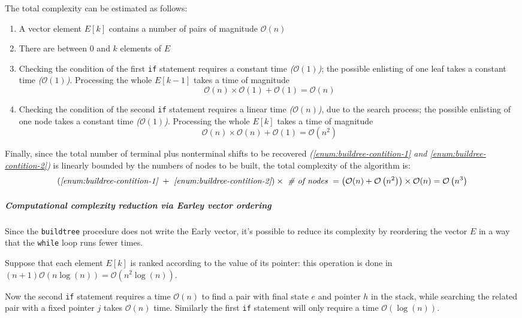 \documentclass[english]{article}
\begin{document}
The total complexity can be estimated as follows:

\begin{enumerate}[label=\arabic*, ref=(\arabic*)]
  \item A vector element \(E[k]\) contains a number of pairs of magnitude \(\mathcal{O}(n)\)
  \item There are between \(0\) and \(k\) elements of \(E\)
        \item\label{enum:buildree-contition-1} Checking the condition of the first \texttt{if} statement requires a constant time \textit{(\(\mathcal{O}(1)\))}; the possible enlisting of one leaf takes a constant time \textit{(\(\mathcal{O}(1)\))}. Processing the whole \(E[k-1]\) takes a time of magnitude
        \[ \mathcal{O}(n) \times \mathcal{O}(1) + \mathcal{O}(1) = \mathcal{O}(n) \]
        \item\label{enum:buildree-contition-2} Checking the condition of the second \texttt{if} statement requires a linear time \textit{(\(\mathcal{O}(n)\))}, due to the search process; the possible enlisting of one node takes a constant time \textit{(\(\mathcal{O}(1)\))}. Processing the whole \(E[k]\) takes a time of magnitude
        \[ \mathcal{O}(n) \times \mathcal{O}(n) + \mathcal{O}(1) = \mathcal{O}\left( n^2 \right)  \]
\end{enumerate}

Finally, since the total number of terminal plus nonterminal shifts to be recovered \textit{(\ref{enum:buildree-contition-1} and \ref{enum:buildree-contition-2})} is linearly bounded by the numbers of nodes to be built, the total complexity of the algorithm is:
\[ \left(\textit{\ref{enum:buildree-contition-1}} \ + \ \textit{\ref{enum:buildree-contition-2}} \right) \times \ \textit{\# of nodes} \ = \left( \mathcal{O}(n) + \mathcal{O}\left( n^2 \right) \right) \times \mathcal{O}(n) = \mathcal{O}\left( n^3 \right) \]

\subparagraph*{Computational complexity reduction via Earley vector ordering}

Since the \texttt{buildtree} procedure does not write the Early vector, it's possible to reduce its complexity by reordering the vector \(E\) in a way that the \texttt{while} loop runs fewer times.

Suppose that each element \(E[k]\) is ranked according to the value of its pointer:
this operation is done in \((n+1) \mathcal{O}\left( n \log{(n)} \right) = \mathcal{O}\left( n^2 \log{(n)} \right)\).

Now the second \texttt{if} statement requires a time \(\mathcal{O}(n)\) to find a pair with final state \(e\) and pointer \(h\) in the stack, while searching the related pair with a fixed pointer \(j\) takes \(\mathcal{O}(n)\) time.
Similarly the first \texttt{if} statement will only require a time \(\mathcal{O}\left( \log{(n)} \right)\).
\end{document}
